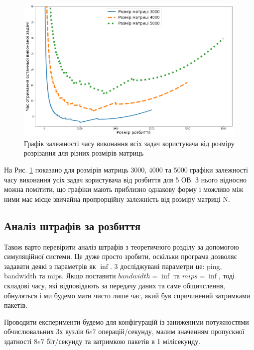 \begin{figure}[H]
	\centering
	\includegraphics[width=\textwidth]{practice/img/one_user_different_N}
	\caption{Графік залежності часу виконання всіх задач користувача від розміру розрізання для різних розмірів матриць}
	\label{fig:one_diff_N}
\end{figure}

На Рис. \ref{fig:one_diff_N} показано для розмірів матриць 3000, 4000 та 5000 графіки залежності часу виконання усіх задач користувача від розбиття для 5 ОВ. З нього відносно можна помітити, що графіки мають приблизно однакову форму і можливо між ними має місце звичайна пропрорційну залежність від розміру матриці N.

\subsection{Аналіз штрафів за розбиття}

Також варто перевірити аналіз штрафів з теоретичного розділу за допомогою симуляційної системи. Це дуже просто зробити, оскільки програма дозволяє задавати деякі з параметрів як $\inf$. 3 досліджувані параметри це: ping, bandwidth та mips. Якщо поставити $bandwidth=\inf$ та $mips=\inf$, тоді складові часу, які відповідають за передачу даних та саме общичслення, обнуляться і ми будемо мати чисто лише час, який був спричинений затримками пакетів.

Проводити експерименти будемо для конфігурацій із заниженими потужностями обчислювальних 3х вузлів $6e7$ операцій/секунду, малим значенням пропускної здатності $8e7$ біт/секунду та затримкою пакетів в 1 мілісекунду.

